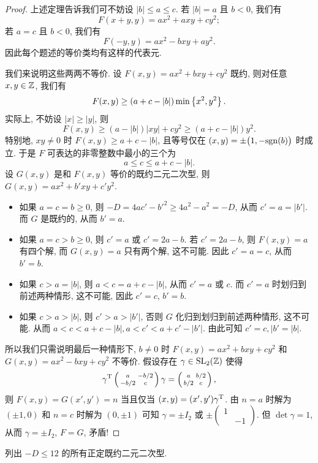 \begin{proof}
上述定理告诉我们可不妨设 $|b|\le a\le c$. 若 $|b|=a$ 且 $b<0$, 我们有
	\[F(x+y,y)=ax^2+axy+cy^2;\]
若 $a=c$ 且 $b<0$, 我们有
	\[F(-y,y)=ax^2-bxy+ay^2.\]
因此每个题述的等价类均有这样的代表元.

我们来说明这些两两不等价. 设 $F(x,y)=ax^2+bxy+cy^2$ 既约, 则对任意 $x,y\in{\mathbb{Z}}$, 我们有
	\[F(x,y)\ge(a+c-|b|)\min\left\{x^2,y^2\right\}.\]
实际上, 不妨设 $|x|\ge |y|$, 则
	\[F(x,y)\ge (a-|b|)|xy|+cy^2\ge(a+c-|b|)y^2.\]
特别地, $xy\neq 0$ 时 $F(x,y)\ge a+c-|b|$, 且等号仅在 $(x,y)=\pm\bigl(1,-{\mathrm{sgn}}(b)\bigr)$ 时成立. 于是 $F$ 可表达的非零整数中最小的三个为
	\[a\le c\le a+c-|b|.\]
设 $G(x,y)$ 是和 $F(x,y)$ 等价的既约二元二次型, 则 $G(x,y)=ax^2+b'xy+c'y^2$.
\begin{itemize}
\item 如果 $a=c=b\ge 0$, 则 $-D=4ac'-b'^2\ge 4a^2-a^2=-D$, 从而 $c'=a=|b'|$. 而 $G$ 是既约的, 从而 $b'=a$.
\item 如果 $a=c>b\ge 0$, 则 $c'=a$ 或 $c'=2a-b$. 若 $c'=2a-b$, 则 $F(x,y)=a$ 有四个解, 而 $G(x,y)=a$ 只有两个解, 这不可能. 因此 $c'=a=c$, 从而 $b'=b$.
\item 如果 $c>a=|b|$, 则 $a<c=a+c-|b|$, 从而 $c'=a$ 或 $c$. 而 $c'=a$ 时划归到前述两种情形, 这不可能, 因此 $c'=c$, $b'=b$.
\item 如果 $c>a>|b|$, 则 $c'>a>|b'|$, 否则 $G$ 化归到划归到前述两种情形, 这不可能. 从而 $a<c<a+c-|b|,a<c'<a+c'-|b'|$. 由此可知 $c'=c,|b'=|b|$.
\end{itemize}
所以我们只需说明最后一种情形下, $b\neq 0$ 时 $F(x,y)=ax^2+bxy+cy^2$ 和 $G(x,y)=ax^2-bxy+cy^2$ 不等价. 假设存在 $\gamma\in{\mathrm{SL}}_2({\mathbb{Z}})$ 使得
	\[\gamma^{\mathrm{T}}\left(\begin{smallmatrix}
	a&-b/2\\-b/2&c
	\end{smallmatrix}\right)\gamma=\left(\begin{smallmatrix}
	a&b/2\\b/2&c
	\end{smallmatrix}\right),\]
则 $F(x,y)=G(x',y')=n$ 当且仅当 $(x,y)=(x',y')\gamma^{\mathrm{T}}$. 由 $n=a$ 时解为 $(\pm1,0)$ 和 $n=c$ 时解为 $(0,\pm1)$ 可知 $\gamma=\pm I_2$ 或 $\pm\left(\begin{smallmatrix}
1&\\&-1
\end{smallmatrix}\right)$. 但 $\det \gamma=1$, 从而 $\gamma=\pm I_2$, $F=G$, 矛盾!
\end{proof}

\begin{example}
列出 $-D\le 12$ 的所有正定既约二元二次型.
\end{example}


